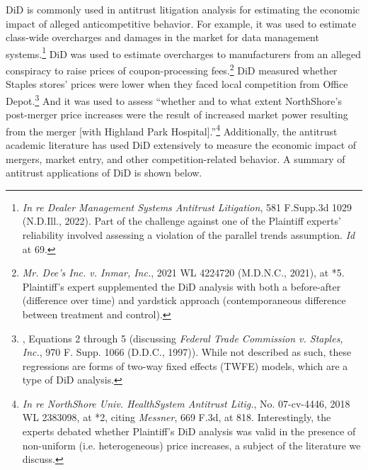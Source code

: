 \documentclass[12pt]{article}
\begin{document}
DiD is commonly used in antitrust litigation analysis for estimating the economic impact of alleged anticompetitive behavior. For example, it was used to estimate class-wide overcharges and damages in the market for data management systems.\footnote{\textit{In re Dealer Management Systems Antitrust Litigation}, 581 F.Supp.3d 1029 (N.D.Ill., 2022). Part of the challenge against one of the Plaintiff experts' reliability involved assessing a violation of the parallel trends assumption. \textit{Id} at 69.}  DiD was used to estimate overcharges to manufacturers from an alleged conspiracy to raise prices of coupon-processing fees.\footnote{\textit{Mr. Dee's Inc. v. Inmar, Inc.}, 2021 WL 4224720 (M.D.N.C., 2021), at *5. Plaintiff’s expert supplemented the DiD analysis with both a before-after (difference over time) and yardstick approach (contemporaneous difference between treatment and control). }  DiD measured whether Staples stores’ prices were lower when they faced local competition from Office Depot.\footnote{\citet{ashenfelter2004}, Equations 2 through 5 (discussing  \textit{Federal Trade Commission v. Staples, Inc.}, 970 F. Supp. 1066 (D.D.C., 1997)). While not described as such, these regressions are forms of two-way fixed effects (TWFE) models, which are a type of DiD analysis.}  And it was used to assess “whether and to what extent NorthShore's post-merger price increases were the result of increased market power resulting from the merger [with Highland Park Hospital].”\footnote{\textit{In re NorthShore Univ. HealthSystem Antitrust Litig.}, No. 07-cv-4446, 2018 WL 2383098, at *2, citing \textit{Messner}, 669 F.3d, at 818. Interestingly, the experts debated whether Plaintiff’s DiD analysis was valid in the presence of non-uniform (i.e. heterogeneous) price increases, a subject of the literature we discuss.} Additionally, the antitrust academic literature has used DiD extensively to measure the economic impact of mergers, market entry, and other competition-related behavior. A summary of antitrust applications of DiD is shown below.  


\end{document}

